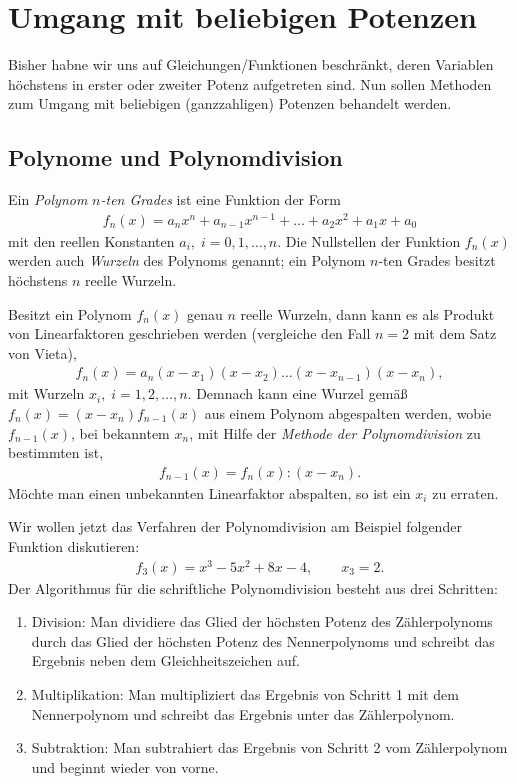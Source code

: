 \section{Umgang mit beliebigen Potenzen}

Bisher habne wir uns auf Gleichungen/Funktionen beschränkt, deren Variablen höchstens in erster oder zweiter Potenz aufgetreten sind. Nun sollen Methoden zum Umgang mit beliebigen (ganzzahligen) Potenzen behandelt werden. 

\subsection{Polynome und Polynomdivision}

Ein \emph{Polynom} $n$\emph{-ten Grades} ist eine Funktion der Form 
\begin{align}
    f_n(x) = a_n x^n + a_{n-1} x^{n-1} + \hdots + a_2 x^2 + a_1 x + a_0
\end{align}
mit den reellen Konstanten $a_i,\; i = 0,1,\hdots,n$. Die Nullstellen der Funktion $f_n(x)$ werden auch \emph{Wurzeln} des Polynoms genannt; ein Polynom $n$-ten Grades besitzt höchstens $n$ reelle Wurzeln. 

Besitzt ein Polynom $f_n(x)$ genau $n$ reelle Wurzeln, dann kann es als Produkt von Linearfaktoren geschrieben werden (vergleiche den Fall $n=2$ mit dem Satz von Vieta), 
\begin{align}
    f_n(x) = a_n (x-x_1)(x-x_2)\hdots (x-x_{n-1})(x-x_n),
\end{align}
mit Wurzeln $x_i, \; i=1,2,\hdots,n$. Demnach kann eine Wurzel gemäß $f_n(x) = (x-x_n)f_{n-1}(x)$ aus einem Polynom abgespalten werden, wobie $f_{n-1}(x)$, bei bekanntem $x_n$, mit Hilfe der \emph{Methode der Polynomdivision} zu bestimmten ist,
\begin{align}
    f_{n-1}(x) = f_n(x) : (x-x_n).
\end{align}
Möchte man einen unbekannten Linearfaktor abspalten, so ist ein $x_i$ zu erraten.

Wir wollen jetzt das Verfahren der Polynomdivision am Beispiel folgender Funktion diskutieren: 
\begin{align}
    f_3(x) = x^3 - 5x^2 + 8x -4, \qquad x_3 = 2.
\end{align}
Der Algorithmus für die schriftliche Polynomdivision besteht aus drei Schritten:
\begin{enumerate}
    \item Division: Man dividiere das Glied der höchsten Potenz des Zählerpolynoms durch das Glied der höchsten Potenz des Nennerpolynoms und schreibt das Ergebnis neben dem Gleichheitszeichen auf. 
    \item Multiplikation: Man multipliziert das Ergebnis von Schritt 1 mit dem Nennerpolynom und schreibt das Ergebnis unter das Zählerpolynom. 
    \item Subtraktion: Man subtrahiert das Ergebnis von Schritt 2 vom Zählerpolynom und beginnt wieder von vorne.
\end{enumerate}


